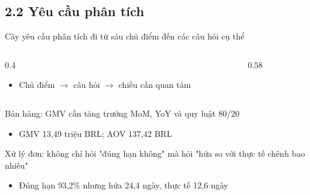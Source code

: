 \subsection{2.2 Yêu cầu phân tích}

\begin{frame}{Cây yêu cầu phân tích đi từ sáu chủ điểm đến các câu hỏi cụ thể}
\begin{columns}[T]\begin{column}{0.4\textwidth}
\begin{itemize}
  \item Chủ điểm $\rightarrow$ câu hỏi $\rightarrow$ chiều cần quan tâm
\end{itemize}
\end{column}\begin{column}{0.58\textwidth}
\begin{center}\end{center}
\end{column}\end{columns}

\end{frame}

\begin{frame}{Bán hàng: GMV cần tăng trưởng MoM, YoY và quy luật 80/20}
\begin{itemize}
  \item GMV 13,49 triệu BRL; AOV 137,42 BRL
\end{itemize}

\end{frame}

\begin{frame}{Xử lý đơn: không chỉ hỏi "đúng hạn không" mà hỏi "hứa so với thực tế chênh bao nhiêu"}
\begin{itemize}
  \item Đúng hạn 93,2\% nhưng hứa 24,4 ngày, thực tế 12,6 ngày
\end{itemize}

\end{frame}


